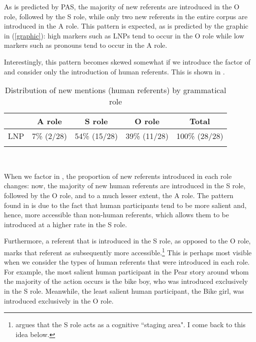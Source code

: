 As is predicted by PAS, the majority of new referents are introduced in the O role, followed by the S role, while only two new referents in the entire corpus are introduced in the A role. This pattern is expected, as is predicted by the graphic in (\ref{graphic}): high  markers such as LNPs tend to occur in the O role while low  markers such as pronouns tend to occur in the A role.

Interestingly, this pattern becomes skewed somewhat if we introduce the factor of  and consider only the introduction of human referents. This is shown in .

\begin{table} 

\caption{{Distribution of new mentions (human referents) by grammatical role}}
\begin{tabular}{ r  c  c  c  c }
\lsptoprule
 & A role & S role & O role & Total\\

\midrule
 \textsc{LNP} & 7{\%} (2/28) & 54{\%} (15/28) & 39{\%} (11/28) & 100{\%} (28/28) \\

\lspbottomrule
\end{tabular}\\
\label{newhumanreferents}

\end{table}

When we factor in , the proportion of new referents introduced in each role changes: now, the majority of new human referents are introduced in the S role, followed by the O role, and to a much lesser extent, the A role. The pattern found in  is due to the fact that human participants tend to be more salient and, hence, more accessible than non-human referents, which allows them to be introduced at a higher rate in the S role. 

Furthermore, a referent that is introduced in the S role, as opposed to the O role, marks that referent as subsequently more accessible.\footnote{\citet[831]{dubois1987} argues that the S role acts as a cognitive ``staging area". I come back to this idea below.} This is perhaps most visible when we consider the types of human referents that were introduced in each role. For example, the most salient human participant in the Pear story around whom the majority of the action occurs is the bike boy, who was introduced exclusively in the S role. Meanwhile, the least salient human participant, the Bike girl, was introduced exclusively in the O role. 


